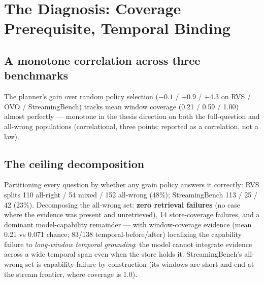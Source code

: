 \section{The Diagnosis: Coverage Prerequisite, Temporal Binding}
\label{sec:diag}

\subsection{A monotone correlation across three benchmarks}
The planner's gain over random policy selection ($-0.1$ / $+0.9$ / $+4.3$ on RVS / OVO / StreamingBench) tracks mean window coverage (0.21 / 0.59 / 1.00) almost perfectly — monotone in the thesis direction on both the full-question and all-wrong populations (correlational, three points; reported as a correlation, not a law).

\subsection{The ceiling decomposition}
Partitioning every question by whether any grain policy answers it correctly: RVS splits 110 all-right / 54 mixed / 152 all-wrong (48\%); StreamingBench 113 / 25 / 42 (23\%). Decomposing the all-wrong set: \textbf{zero retrieval failures} (no case where the evidence was present and unretrieved), 14 store-coverage failures, and a dominant model-capability remainder — with window-coverage evidence (mean 0.21 vs 0.071 chance; 83/138 temporal-before/after) localizing the capability failure to \emph{long-window temporal grounding}: the model cannot integrate evidence across a wide temporal span even when the store holds it. StreamingBench's all-wrong set is capability-failure by construction (its windows are short and end at the stream frontier, where coverage is 1.0).

